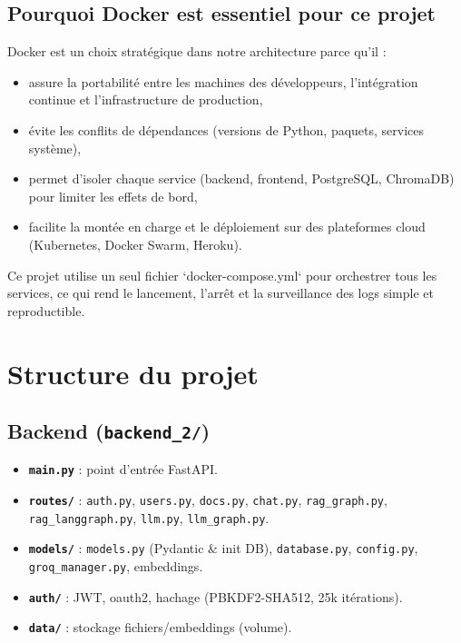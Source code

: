 \subsection{Pourquoi Docker est essentiel pour ce projet}

Docker est un choix stratégique dans notre architecture parce qu'il :
\begin{itemize}
    \item assure la portabilité entre les machines des développeurs, l'intégration continue et l'infrastructure de production,
    \item évite les conflits de dépendances (versions de Python, paquets, services système),
    \item permet d'isoler chaque service (backend, frontend, PostgreSQL, ChromaDB) pour limiter les effets de bord,
    \item facilite la montée en charge et le déploiement sur des plateformes cloud (Kubernetes, Docker Swarm, Heroku). 
\end{itemize}

Ce projet utilise un seul fichier `docker-compose.yml` pour orchestrer tous les services, ce qui rend le lancement, l'arrêt et la surveillance des logs simple et reproductible.

\section{Structure du projet}

\subsection{Backend (\texttt{backend\_2/})}
\begin{itemize}
    \item \textbf{\texttt{main.py}} : point d'entrée FastAPI.
    \item \textbf{\texttt{routes/}} : \texttt{auth.py}, \texttt{users.py}, \texttt{docs.py}, \texttt{chat.py}, \texttt{rag\_graph.py}, \texttt{rag\_langgraph.py}, \texttt{llm.py}, \texttt{llm\_graph.py}.
    \item \textbf{\texttt{models/}} : \texttt{models.py} (Pydantic \& init DB), \texttt{database.py}, \texttt{config.py}, \texttt{groq\_manager.py}, embeddings.
    \item \textbf{\texttt{auth/}} : JWT, oauth2, hachage (PBKDF2-SHA512, 25k itérations).
    \item \textbf{\texttt{data/}} : stockage fichiers/embeddings (volume).
\end{itemize}

